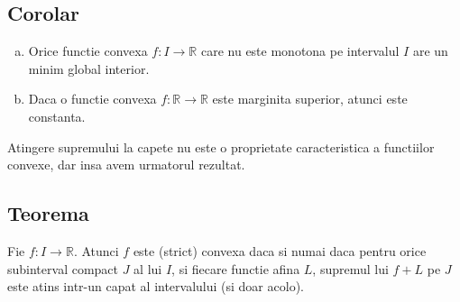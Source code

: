 \documentclass[a4paper,12pt,oneside]{report}
\begin{document}
\subsection{Corolar}
\begin{enumerate}[a)]
\item Orice functie convexa \(f: I \rightarrow \mathbb{R}\) care nu este monotona pe
intervalul \(I\) are un minim global interior. 
\item Daca o functie convexa \(f: \mathbb{R} \rightarrow \mathbb{R}\) este marginita superior, atunci este constanta.
\end{enumerate}
Atingere supremului la capete nu este o proprietate caracteristica a functiilor convexe, dar insa avem urmatorul rezultat. 

\subsection{Teorema}

Fie \(f: I \rightarrow \mathbb{R}\). Atunci \(f\) este (strict) convexa daca si numai daca pentru orice subinterval compact \(J\) al lui \(I\), si fiecare functie afina \(L\), supremul lui \(f+L\) pe \(J\) este atins intr-un capat al intervalului (si doar acolo). 
\end{document}
